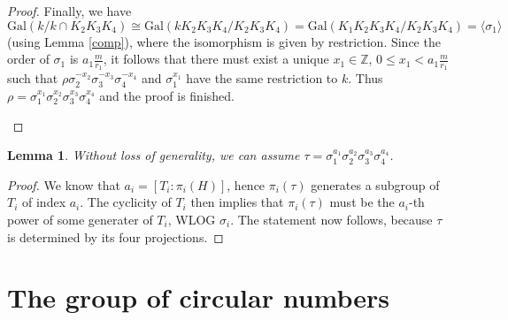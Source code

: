 \documentclass[12pt,a4paper]{article}
\newtheorem{lemma}[theorem]{Lemma}
\newcommand{\Q}{\mathbb{Q}}
\newcommand{\Z}{\mathbb{Z}}
\newcommand{\Gal}{\mathrm{Gal}}
\newcommand\restr[2]{{%
  \left.\kern-\nulldelimiterspace %
  #1 %
  \right|_{#2} %
  }}
\begin{document}
\begin{proof}
Finally, we have $$\Gal(k/k\cap K_2K_3K_4)\cong \Gal(kK_2K_3K_4/K_2K_3K_4)=\Gal(K_1K_2K_3K_4/K_2K_3K_4)=\langle\sigma_1\rangle$$
(using Lemma \ref{comp}), where the isomorphism is given by restriction. Since the order of $\sigma_1$ is $a_1\frac{m}{r_1}$, it follows that there must exist a unique $x_1\in \Z$, $0\leq x_1<a_1\frac{m}{r_1}$ such that $\rho\sigma_2^{-x_2}\sigma_3^{-x_3}\sigma_4^{-x_4}$ and $\sigma_1^{x_1}$ have the same restriction to $k$. Thus $\rho=\sigma_1^{x_1}\sigma_2^{x_2}\sigma_3^{x_3}\sigma_4^{x_4}$ and the proof is finished.
\begin{center}
\end{center}
\end{proof}

\begin{lemma}
Without loss of generality, we can assume $\tau=\sigma_1^{a_1}\sigma_2^{a_2}\sigma_3^{a_3}\sigma_4^{a_4}$.
\end{lemma}
\begin{proof}
We know that $a_i=[T_i:\pi_i(H)]$, hence
$\pi_i(\tau)$ generates a subgroup of $T_i$ of index $a_i$. The cyclicity of $T_i$ then implies that $\pi_i(\tau)$ must be the $a_i$-th power of some generater of $T_i$, WLOG $\sigma_i$. The statement now follows, because $\tau$ is determined by its four projections.
\end{proof}

\section{The group of circular numbers}
\end{document}
